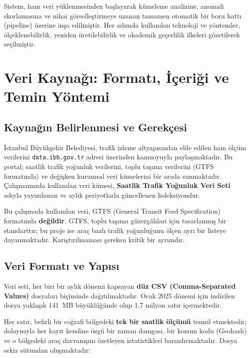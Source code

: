 \documentclass[12pt,a4paper]{article}
\begin{document}
Sistem, ham veri yüklenmesinden başlayarak kümeleme analizine, anomali skorlamasına ve nihai görselleştirmeye uzanan tamamen otomatik bir boru hattı (pipeline) üzerine inşa edilmiştir. Her adımda kullanılan teknoloji ve yöntemler, ölçeklenebilirlik, yeniden üretilebilirlik ve akademik geçerlilik ilkeleri gözetilerek seçilmiştir.

\section{Veri Kaynağı: Formatı, İçeriği ve Temin Yöntemi}

\subsection{Kaynağın Belirlenmesi ve Gerekçesi}

İstanbul Büyükşehir Belediyesi, trafik izleme altyapısından elde edilen ham ölçüm verilerini \texttt{data.ibb.gov.tr} adresi üzerinden kamuoyuyla paylaşmaktadır. Bu portal; saatlik trafik yoğunluk verilerini, toplu taşıma verilerini (GTFS formatında) ve değişken kurumsal veri kümelerini bir arada sunmaktadır. Çalışmamızda kullanılan veri kümesi, \textbf{Saatlik Trafik Yoğunluk Veri Seti} adıyla yayımlanan ve aylık periyotlarla güncellenen koleksiyondur.

\begin{importantbox}
Bu çalışmada kullanılan veri, GTFS (General Transit Feed Specification) formatında \textbf{değildir}. GTFS, toplu taşıma güzergâhları için tasarlanmış bir standarttır; bu proje ise araç bazlı trafik yoğunluğunu ölçen ayrı bir listeye dayanmaktadır. Karıştırılmaması gereken kritik bir ayrımdır.
\end{importantbox}

\subsection{Veri Formatı ve Yapısı}

Veri seti, her biri bir aylık dönemi kapsayan \textbf{düz CSV (Comma-Separated Values)} dosyaları biçiminde dağıtılmaktadır. Ocak 2025 dönemi için indirilen dosya yaklaşık 141~MB büyüklüğünde olup 1,7 milyon satır içermektedir.

Her satır, belirli bir coğrafi bölgedeki \textbf{tek bir saatlik ölçümü} temsil etmektedir; dolayısıyla her kayıt kendine özgü bir zaman damgası, bir konum kodu (Geohash) ve o bölgedeki araç davranışını özetleyen istatistikleri barındırmaktadır. Dosya sekiz sütundan oluşmaktadır:
\end{document}
